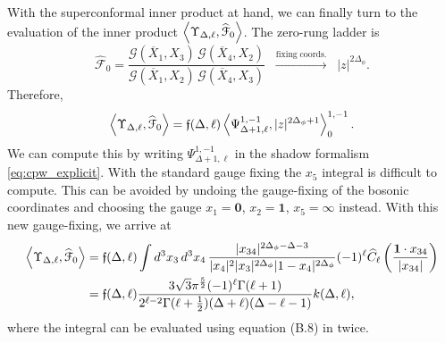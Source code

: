 \documentclass[11pt]{article}
\newcommand{\Xb}{\overline{X}}
\begin{document}
With the superconformal inner product at hand, we can finally turn to the evaluation of the inner product $\expval{\Upsilon_{\Delta,\ell},\widehat{\mathcal{F}}_{0}}$. The zero-rung ladder is
%
\begin{equation}\label{eq:zero-rung}
\widehat{\mathcal{F}}_{0} 
= \frac{\mathscr{G}(\Xb_{1},X_{3})\, \mathscr{G}(\Xb_{4},X_{2})}{\mathscr{G}(\Xb_{1},X_{2})\,   \mathscr{G}(\Xb_{4},X_{3})} \;\; \xrightarrow{\mathrm{fixing\;coords.}} \;\; |z|^{2\Delta_{\phi}}.
\end{equation}
%
Therefore,
%
\begin{equation}\label{eq:zero-rung_ip}
\expval{\Upsilon_{\Delta,\ell},\widehat{\mathcal{F}}_{0}} = \mathfrak{f}(\Delta,\ell)\expval{ \Psi_{\Delta+1,\ell}^{1,-1},|z|^{2\Delta_{\phi}+1} }_{0}^{1,-1}.
\end{equation}
%
We can compute this by writing $\Psi_{\Delta+1,\ell}^{1,-1}$ in the shadow formalism \eqref{eq:cpw_explicit}. With the standard gauge fixing the $x_{5}$ integral is difficult to compute. This can be avoided by undoing the gauge-fixing of the bosonic coordinates and choosing the gauge $x_{1} = \mathbf{0}$, $x_{2} = \mathbf{1}$, $x_{5} = \infty$ instead. With this new gauge-fixing, we arrive at
%
\begin{equation}\label{eq:zero-rung_ip_final}
\begin{split}
\expval{\Upsilon_{\Delta,\ell},\widehat{\mathcal{F}}_{0}} &= \mathfrak{f}(\Delta,\ell)\int d^{3}x_{3}\,d^{3}x_{4}\,\frac{|x_{34}|^{2\Delta_{\phi}-\Delta-3}}{|x_{4}|^{2}|x_{3}|^{2\Delta_{\phi}}|1-x_{4}|^{2\Delta_{\phi}}}(-1)^{\ell}\widehat{C}_{\ell}\left(\frac{\mathbf{1} \cdot x_{34}}{|x_{34}|}\right) \\
  &= \mathfrak{f}(\Delta,\ell)\frac{3\sqrt{3}\pi^{\frac{5}{2}}(-1)^{\ell}\Gamma(\ell+1)}{2^{\ell-2}\Gamma(\ell+\frac{1}{2})(\Delta+\ell)(\Delta-\ell-1)}k(\Delta,\ell),
\end{split}
\end{equation}
%
where the integral can be evaluated using equation (B.8) in \cite{Murugan:2017eto} twice.
\end{document}
